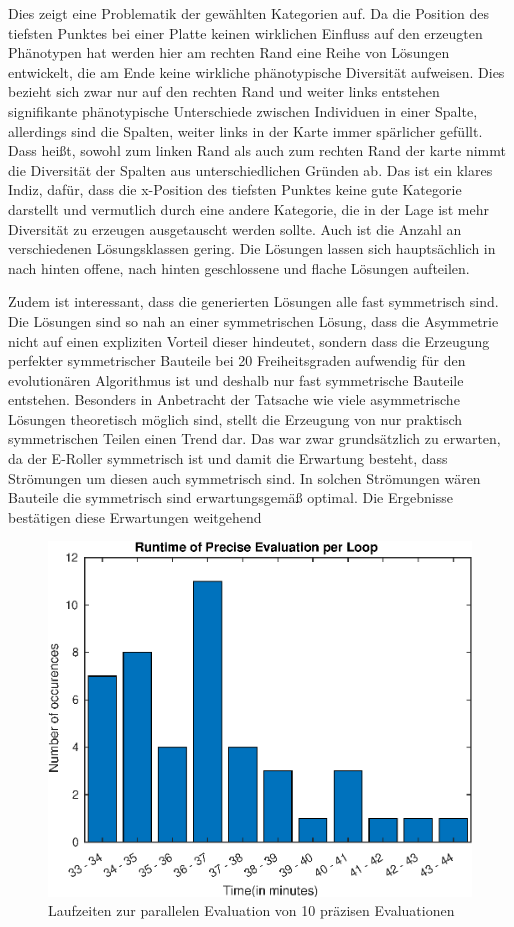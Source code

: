 Dies zeigt eine Problematik der gewählten Kategorien auf.
Da die Position des tiefsten Punktes bei einer Platte keinen wirklichen Einfluss auf den erzeugten Phänotypen hat werden hier am rechten Rand eine Reihe von Lösungen entwickelt, die am Ende keine wirkliche phänotypische Diversität aufweisen.
Dies bezieht sich zwar nur auf den rechten Rand und weiter links entstehen signifikante phänotypische Unterschiede zwischen Individuen in einer Spalte, allerdings sind die Spalten, weiter links in der Karte immer spärlicher gefüllt.
Dass heißt, sowohl zum linken Rand als auch zum rechten Rand der karte nimmt die Diversität der Spalten aus unterschiedlichen Gründen ab.
Das ist ein klares Indiz, dafür, dass die x-Position des tiefsten Punktes keine gute Kategorie darstellt und vermutlich durch eine andere Kategorie, die in der Lage ist mehr Diversität zu erzeugen ausgetauscht werden sollte.
Auch ist die Anzahl an verschiedenen Lösungsklassen gering. Die Lösungen lassen sich hauptsächlich in nach hinten offene, nach hinten geschlossene und flache Lösungen aufteilen.

Zudem ist interessant, dass die generierten Lösungen alle fast symmetrisch sind.
Die Lösungen sind so nah an einer symmetrischen Lösung, dass die Asymmetrie nicht auf einen expliziten Vorteil dieser hindeutet, sondern dass die Erzeugung perfekter symmetrischer Bauteile bei 20 Freiheitsgraden aufwendig für den evolutionären Algorithmus ist und deshalb nur fast symmetrische Bauteile entstehen.
Besonders in Anbetracht der Tatsache wie viele asymmetrische Lösungen theoretisch möglich sind, stellt die Erzeugung von nur praktisch symmetrischen Teilen einen Trend dar.
Das war zwar grundsätzlich zu erwarten, da der E-Roller symmetrisch ist und damit die Erwartung besteht, dass Strömungen um diesen auch symmetrisch sind.
In solchen Strömungen wären Bauteile die symmetrisch sind erwartungsgemäß optimal. 
Die Ergebnisse bestätigen diese Erwartungen weitgehend

\begin{figure}[h]
	\centering
	\includegraphics[width=.7\linewidth]{bilder/escooter/peRuntime}
	\caption{Laufzeiten zur parallelen Evaluation von 10 präzisen Evaluationen}
	\label{fig:escooterpeRuntime}
\end{figure}

